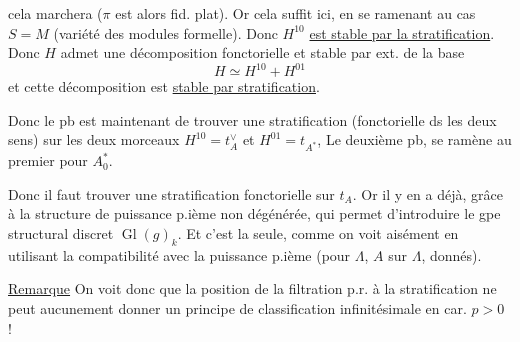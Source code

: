 cela marchera ($\pi$ est alors fid. plat). Or cela suffit ici, en se ramenant au cas $S=M$ (variété des modules formelle). Donc $H^{10}$ \uline{est stable par la stratification}. Donc $H$ admet une décomposition fonctorielle et stable par ext. de la base
\[
H\simeq H^{10}+H^{01}
\]
et cette décomposition est \uline{stable par stratification}.

Donc le pb est maintenant de trouver une stratification  (fonctorielle ds les deux sens) sur les deux morceaux $H^{10}=t_A^\vee$ et $H^{01}=t_{A^*}$, Le deuxième pb,  se ramène au premier pour $A_0^*$.

Donc il faut trouver une stratification fonctorielle sur $t_A$. Or il y en a déjà, grâce à la structure de puissance p.ième non dégénérée, qui permet d'introduire le gpe structural discret $\operatorname{Gl}(g)_k$.  Et c'est la seule, comme on voit aisément en utilisant la compatibilité avec la puissance p.ième (pour $\Lambda$, $A$ sur $\Lambda$, donnés).

\uline{Remarque} On voit donc que la position de la filtration p.r. à la stratification ne peut aucunement donner un principe de classification  infinitésimale en car. $p>0$ !
